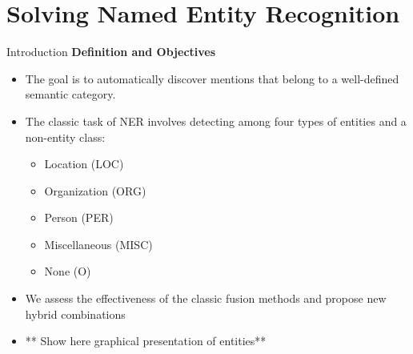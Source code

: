 \documentclass[10pt,xcolor=table]{beamer}
\begin{document}
%
%

\section[Applications to NLP]{Solving Named Entity Recognition}



\begin{frame}{Introduction}
\textbf{Definition and Objectives}
\begin{itemize}
\item  The goal is to automatically discover  mentions that belong to a well-defined semantic category. 
\item The classic task of NER involves detecting among four types of entities and a non-entity class:
	\begin{itemize}
	\item Location (LOC)
	\item Organization (ORG)
	\item Person (PER)
	\item Miscellaneous (MISC)
	\item None (O)
	\end{itemize}
\item We assess the effectiveness of the classic fusion methods and propose new hybrid combinations 
\item ** Show here graphical presentation of entities**
\end{itemize}
\end{frame}
\end{document}
